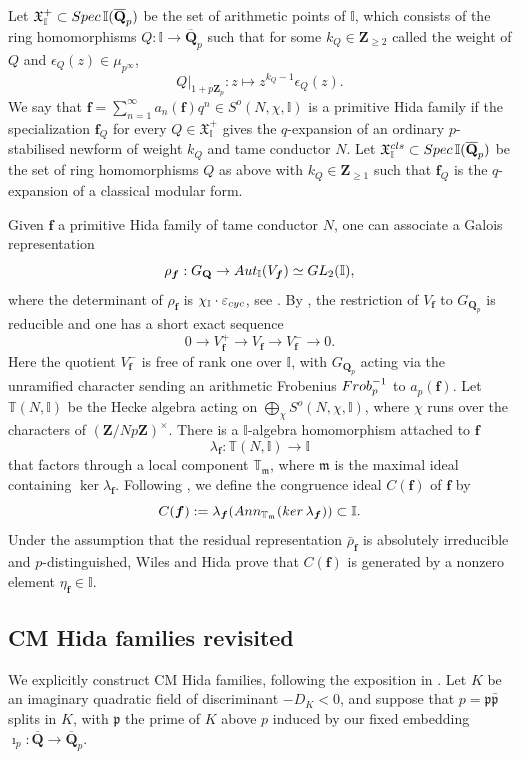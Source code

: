 \documentclass[10pt,letterpaper]{amsart}
\theoremstyle{plain}
\theoremstyle{definition}
\theoremstyle{definition}
\theoremstyle{plain}
\theoremstyle{plain}
\theoremstyle{plain}
\theoremstyle{remark}
\numberwithin{equation}{section}
\newcommand{\pp}{\mathfrak{p}}
\newcommand{\ppbar}{\bar{\mathfrak{p}}}
\newcommand{\fkm}{\mathfrak{m}}
\newcommand{\Q}{\mathbf{Q}}
\newcommand{\Z}{\mathbf{Z}}
\newcommand{\bT}{\mathbb{T}}
\newcommand{\cR}{\mathbb{I}}
\newcommand{\bfff}{{\boldsymbol{f}}}
\begin{document}
Let $\mathfrak{X}_\cR^+\subset{\rm Spec}\,\cR(\overline{\Q}_p)$ be the set of {arithmetic points} of $\cR$, which consists of the ring homomorphisms $Q:\cR\rightarrow\overline{\Q}_p$ such that for some $k_Q\in\Z_{\geq 2}$ called the {weight of $Q$} and $\epsilon_Q(z)\in\mu_{p^\infty}$,
$$Q\vert_{1+p\Z_p}:z\mapsto z^{k_Q-1}\epsilon_Q(z).$$   We say that $\boldsymbol{f}=\sum_{n=1}^\infty a_n(\bfff)q^n\in S^o(N,\chi,\cR)$ is a {primitive Hida family} if the specialization $\boldsymbol{f}_Q$ for every $Q\in\mathfrak{X}_\cR^+$ gives the $q$-expansion of an ordinary $p$-stabilised newform of weight  $k_Q$ and tame conductor $N$. Let $\mathfrak{X}_{\cR}^{\rm cls}\subset{\rm Spec}\,\cR(\overline{\Q}_p)$ be the set of ring homomorphisms $Q$ as above with $k_Q\in\Z_{\geq 1}$ such that $\bfff_Q$ is the $q$-expansion of a classical modular form.

Given $\bfff$ a primitive Hida family of tame conductor $N$, one can associate a Galois representation 
\[
\rho_{\bfff}:G_\Q\rightarrow{\rm Aut}_{\cR}(V_\bfff)\simeq{\rm GL}_2(\cR),
\]
where the determinant of $\rho_\bfff$ is $\chi_\cR\cdot\varepsilon_{\rm cyc}$, see \cite[\S{3.2}]{hsieh-triple}. By \cite[Thm.~2.2.2]{wiles88}, the restriction of $V_\bfff$ to $G_{\Q_p}$ is reducible and one has a short exact sequence
\[
0\rightarrow V_\bfff^+\rightarrow V_\bfff\rightarrow V_\bfff^-\rightarrow 0.
\]
Here the quotient $V_\bfff^-$ is free of rank one over $\cR$, with $G_{\Q_p}$ acting via the unramified character sending an arithmetic Frobenius ${\rm Frob}_p^{-1}$ to $a_p(\bfff)$. Let $\bT(N,\cR)$ be the Hecke algebra acting on $\bigoplus_\chi S^o(N,\chi,\cR)$, where $\chi$ runs over the characters of $(\Z/Np\Z)^\times$. There is a $\cR$-algebra homomorphism attached to $\bfff$
\[
\lambda_{\bfff}:\bT(N,\cR)\rightarrow\cR
\] 
that factors through a local component $\bT_{\fkm}$, where $\fkm$ is the maximal ideal containing $\ker \lambda_{\bfff}$. Following \cite{hida-AJM}, we define the {congruence ideal} $C(\bfff)$ of $\bfff$ by
\[
C(\bfff):=\lambda_{\bfff}({\rm Ann}_{\bT_\fkm}({\rm ker}\,\lambda_\bfff))\subset\cR.
\] 
Under the assumption that the residual representation $\bar{\rho}_{\bfff}$ is absolutely irreducible and $p$-distinguished, Wiles \cite{Wiles} and Hida \cite{hida-AJM} prove that $C(\bfff)$ is generated by a nonzero element $\eta_{\bfff}\in\cR$.

\subsection{CM Hida families revisited}
\label{subsec:CM}
We explicitly construct CM Hida families, following the exposition in \cite[\S{8.1}]{hsieh-triple}. Let $K$ be an imaginary quadratic field of discriminant $-D_K<0$, and suppose that $p=\pp\ppbar$ splits in $K$, with $\pp$ the prime of $K$ above $p$ induced by our fixed embedding $\imath_p:\overline{\Q}\rightarrow\overline{\Q}_p$. 
\end{document}

